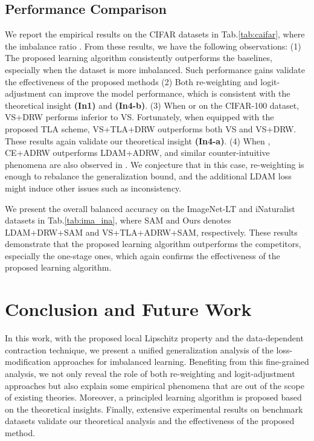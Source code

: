 \subsection{Performance Comparison}

We report the empirical results on the CIFAR datasets in Tab.\ref{tab:caifar}, where the imbalance ratio . From these results, we have the following observations: (1) The proposed learning algorithm consistently outperforms the baselines, especially when the dataset is more imbalanced. Such performance gains validate the effectiveness of the proposed methods (2) Both re-weighting and logit-adjustment can improve the model performance, which is consistent with the theoretical insight \textbf{(In1)} and \textbf{(In4-b)}. (3) When  or on the CIFAR-100 dataset, VS+DRW performs inferior to VS. Fortunately, when equipped with the proposed TLA scheme, VS+TLA+DRW outperforms both VS and VS+DRW. These results again validate our theoretical insight \textbf{(In4-a)}. (4) When , CE+ADRW outperforms LDAM+ADRW, and similar counter-intuitive phenomena are also observed in \cite{rangwani2022escaping}. We conjecture that in this case, re-weighting is enough to rebalance the generalization bound, and the additional LDAM loss might induce other issues such as inconsistency.

We present the overall balanced accuracy on the ImageNet-LT and iNaturalist datasets in Tab.\ref{tab:ima_ina}, where SAM and Ours denotes LDAM+DRW+SAM and VS+TLA+ADRW+SAM, respectively. These results demonstrate that the proposed learning algorithm outperforms the competitors, especially the one-stage ones, which again confirms the effectiveness of the proposed learning algorithm.

\section{Conclusion and Future Work}
\label{sec:conclusion}
In this work, with the proposed local Lipschitz property and the data-dependent contraction technique, we present a unified generalization analysis of the loss-modification approaches for imbalanced learning. Benefiting from this fine-grained analysis, we not only reveal the role of both re-weighting and logit-adjustment approaches but also explain some empirical phenomena that are out of the scope of existing theories. Moreover, a principled learning algorithm is proposed based on the theoretical insights. Finally, extensive experimental results on benchmark datasets validate our theoretical analysis and the effectiveness of the proposed method. 

